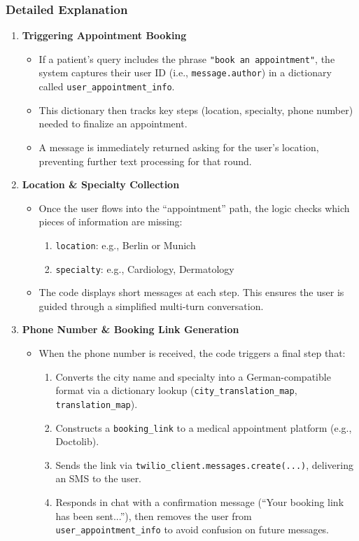\subsubsection*{Detailed Explanation}

\begin{enumerate}
    \item \textbf{Triggering Appointment Booking}
    \begin{itemize}
        \item If a patient’s query includes the phrase \texttt{"book an appointment"}, the system captures their user ID (i.e., \texttt{message.author}) in a dictionary called \texttt{user\_appointment\_info}.
        \item This dictionary then tracks key steps (location, specialty, phone number) needed to finalize an appointment.
        \item A message is immediately returned asking for the user’s location, preventing further text processing for that round.
    \end{itemize}

    \item \textbf{Location \& Specialty Collection}
    \begin{itemize}
        \item Once the user flows into the “appointment” path, the logic checks which pieces of information are missing:
        \begin{enumerate}
            \item \texttt{location}: e.g., Berlin or Munich
            \item \texttt{specialty}: e.g., Cardiology, Dermatology
        \end{enumerate}
        \item The code displays short messages at each step. This ensures the user is guided through a simplified multi-turn conversation.
    \end{itemize}

    \item \textbf{Phone Number \& Booking Link Generation}
    \begin{itemize}
        \item When the phone number is received, the code triggers a final step that:
        \begin{enumerate}
            \item Converts the city name and specialty into a German-compatible format via a dictionary lookup (\texttt{city\_translation\_map}, \texttt{translation\_map}).
            \item Constructs a \texttt{booking\_link} to a medical appointment platform (e.g., Doctolib).
            \item Sends the link via \texttt{twilio\_client.messages.create(...)}, delivering an SMS to the user.
            \item Responds in chat with a confirmation message (``Your booking link has been sent...''), then removes the user from \texttt{user\_appointment\_info} to avoid confusion on future messages.
        \end{enumerate}
    \end{itemize}


\end{enumerate}
